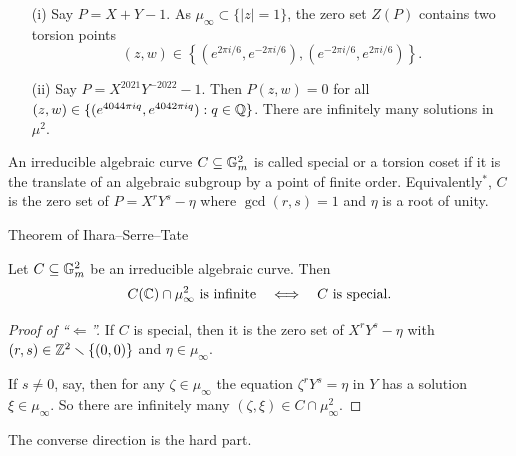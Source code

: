 \documentclass{beamer}
\begin{document}
\begin{frame}
  \begin{example}
    \begin{itemize}
    \item [(i)] Say $P = X+Y-1$. As $\mu_\infty \subset \{|z|=1\}$, 
      the zero set $Z(P)$ contains two torsion points
      $$
      (z,w) \in \left\{ (e^{2\pi i/6},e^{-2\pi i/6}),(e^{-2\pi
          i/6},e^{2\pi i/6})\right\}.
      $$

    \item[(ii)] Say
      $P=X^{2021}Y^{-2022}-1$. Then
      $P(z,w)=0$ for all $(z,w)\in \{(e^{4044\pi iq},e^{4042\pi i
        q}) : q\in{\mathbb{Q}}\}$.
      There are infinitely many solutions in $\mu^2$.
    \end{itemize}
  \end{example}

  \begin{definition}
    An irreducible algebraic curve $C\subseteq {\mathbb{G}}_m^2$
    is called \alert{special} or a \alert{torsion coset} if it is the translate of an algebraic subgroup by
    a point of finite order. Equivalently${}^*$,
    $C$  is the zero set of    $P=X^rY^s-\eta$ where
    $\gcd(r,s)=1$ 
    and $\eta$ is a root of unity. 
  \end{definition}
\end{frame}

\begin{frame}{Theorem of Ihara--Serre--Tate}
  \begin{theorem}
    Let $C\subseteq {\mathbb{G}}_m^2$ be an irreducible algebraic curve.
    Then
    \begin{equation*}
      C({\mathbb{C}}) \cap \mu_\infty^2\text{ is infinite}\quad\Longleftrightarrow\quad \text{$C$ is special}. 
    \end{equation*}
  \end{theorem}

  \begin{proof}[Proof of ``$\Longleftarrow$'']
    If $C$ is special, then it is the zero set of $X^rY^s-\eta$ with
    $(r,s)\in{\mathbb{Z}}^2\smallsetminus\{(0,0)\}$ and $\eta\in \mu_\infty$.

    If $s\not=0$, say, then for any $\zeta\in\mu_\infty$ the equation
    $\zeta^r Y^s =\eta$ in $Y$ has a solution $\xi\in\mu_\infty$.
    So there are infinitely many $(\zeta,\xi)\in
    C\cap\mu_\infty^2$.     
  \end{proof}

  The converse direction is the hard part. 
\end{frame}
\end{document}
